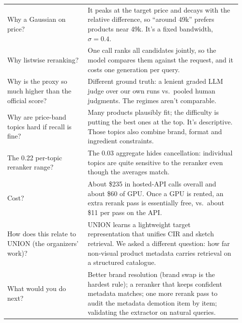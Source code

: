 \documentclass[11pt]{article}
\begin{document}
\begin{longtable}{@{}p{0.33\linewidth}p{0.63\linewidth}@{}}
Why a Gaussian on price? &
It peaks at the target price and decays with the relative difference, so ``around 49k''
prefers products near 49k. It's a fixed bandwidth, $\sigma=0.4$. \\ \addlinespace
Why listwise reranking? &
One call ranks all candidates jointly, so the model compares them against the request, and
it costs one generation per query. \\ \addlinespace
Why is the proxy so much higher than the official score? &
Different ground truth: a lenient graded LLM judge over our own runs vs.\ pooled human
judgments. The regimes aren't comparable. \\ \addlinespace
Why are price-band topics hard if recall is fine? &
Many products plausibly fit; the difficulty is putting the best ones at the top. It's
descriptive. Those topics also combine brand, format and ingredient constraints. \\ \addlinespace
The 0.22 per-topic reranker range? &
The 0.03 aggregate hides cancellation: individual topics are quite sensitive to the
reranker even though the averages match. \\ \addlinespace
Cost? &
About \$235 in hosted-API calls overall and about \$60 of GPU. Once a GPU is rented, an
extra rerank pass is essentially free, vs.\ about \$11 per pass on the API. \\ \addlinespace
How does this relate to UNION (the organizers' work)? &
UNION learns a lightweight target representation that unifies CIR and sketch retrieval. We
asked a different question: how far non-visual product metadata carries retrieval on a
structured catalogue. \\ \addlinespace
What would you do next? &
Better brand resolution (brand swap is the hardest rule); a reranker that keeps confident
metadata matches; one more rerank pass to audit the metadata demotion item by item;
validating the extractor on natural queries. \\
\bottomrule
\end{longtable}

\end{document}
